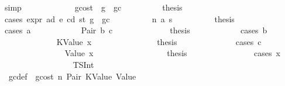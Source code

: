 \begin{isabellebody}
\ simp\isanewline
\ \ \ \ \isamarkupfalse%
\isanewline
\ \ \ \ \ \ \isamarkupfalse%
\ gcost{\isacharcolon}{\kern0pt}\ {\isachardoublequoteopen}{\isasymnot}\ g\ {\isasymle}\ gc{\isachardoublequoteclose}\isanewline
\ \ \ \ \ \ \isamarkupfalse%
\ \isamarkupfalse%
\ {\isacharquery}{\kern0pt}thesis\isanewline
\ \ \ \ \ \ \isamarkupfalse%
\ {\isacharparenleft}{\kern0pt}cases\ {\isachardoublequoteopen}expr\ ad\ e\ cd\ st\ {\isacharparenleft}{\kern0pt}g\ {\isacharminus}{\kern0pt}\ gc{\isacharparenright}{\kern0pt}{\isachardoublequoteclose}{\isacharparenright}{\kern0pt}\isanewline
\ \ \ \ \ \ \ \ \isamarkupfalse%
\ {\isacharparenleft}{\kern0pt}n\ a\ s{\isacharparenright}{\kern0pt}\isanewline
\ \ \ \ \ \ \ \ \isamarkupfalse%
\ {\isacharquery}{\kern0pt}thesis\isanewline
\ \ \ \ \ \ \ \ \isamarkupfalse%
\ {\isacharparenleft}{\kern0pt}cases\ a{\isacharparenright}{\kern0pt}\isanewline
\ \ \ \ \ \ \ \ \ \ \isamarkupfalse%
\ {\isacharparenleft}{\kern0pt}Pair\ b\ c{\isacharparenright}{\kern0pt}\isanewline
\ \ \ \ \ \ \ \ \ \ \isamarkupfalse%
\ \isamarkupfalse%
\ {\isacharquery}{\kern0pt}thesis\isanewline
\ \ \ \ \ \ \ \ \ \ \isamarkupfalse%
\ {\isacharparenleft}{\kern0pt}cases\ b{\isacharparenright}{\kern0pt}\isanewline
\ \ \ \ \ \ \ \ \ \ \ \ \isamarkupfalse%
\ {\isacharparenleft}{\kern0pt}KValue\ x{}{\isacharparenright}{\kern0pt}\isanewline
\ \ \ \ \ \ \ \ \ \ \ \ \isamarkupfalse%
\ \isamarkupfalse%
\ {\isacharquery}{\kern0pt}thesis\isanewline
\ \ \ \ \ \ \ \ \ \ \ \ \isamarkupfalse%
\ {\isacharparenleft}{\kern0pt}cases\ c{\isacharparenright}{\kern0pt}\isanewline
\ \ \ \ \ \ \ \ \ \ \ \ \ \ \isamarkupfalse%
\ {\isacharparenleft}{\kern0pt}Value\ x{}{\isacharparenright}{\kern0pt}\isanewline
\ \ \ \ \ \ \ \ \ \ \ \ \ \ \isamarkupfalse%
\ \isamarkupfalse%
\ {\isacharquery}{\kern0pt}thesis\isanewline
\ \ \ \ \ \ \ \ \ \ \ \ \ \ \isamarkupfalse%
\ {\isacharparenleft}{\kern0pt}cases\ x{}{\isacharparenright}{\kern0pt}\isanewline
\ \ \ \ \ \ \ \ \ \ \ \ \ \ \ \ \isamarkupfalse%
\ {\isacharparenleft}{\kern0pt}TSInt\ {\isacharunderscore}{\kern0pt}{\isacharparenright}{\kern0pt}\isanewline
\ \ \ \ \ \ \ \ \ \ \ \ \ \ \ \ \isamarkupfalse%
\ {}{}\ gc{\isacharunderscore}{\kern0pt}def\ {\isacharasterisk}{\kern0pt}\ gcost\ n\ Pair\ KValue\ Value\ \isamarkupfalse%

\end{isabellebody}
